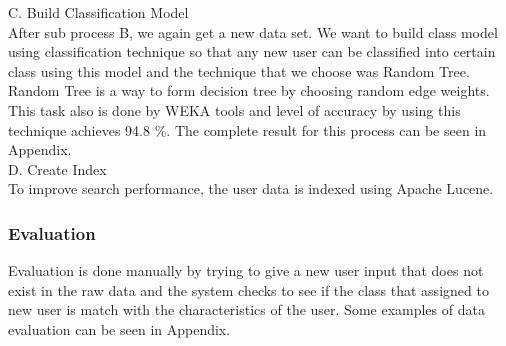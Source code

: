 C. Build Classification Model\\
After sub process B, we again get a new data set. We want to build class model using classification technique so that any new user can be classified into certain class using this model and the technique that we choose was Random Tree. Random Tree is a way to form decision tree by choosing random edge weights. This task also is done by WEKA tools and level of accuracy by using this technique achieves 94.8 \%. The complete result for this process can be seen in Appendix. \\

D. Create Index\\
To improve search performance, the user data is indexed using Apache Lucene.\\


\subsubsection*{Evaluation}
Evaluation is done manually by trying to give a new user input that does not exist in the raw data and the system checks to see if the class that assigned to new user is match with the characteristics of the user. Some examples of data evaluation can be seen in Appendix.
